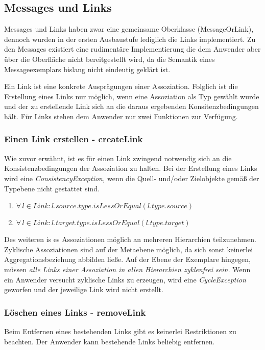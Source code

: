 \subsection{Messages und Links}

Messages und Links haben zwar eine gemeinsame Oberklasse (MessageOrLink), dennoch wurden in der
ersten Ausbaustufe lediglich die Links implementiert. Zu den Messages existiert eine rudimentäre
Implementierung die dem Anwender aber über die Oberfläche nicht bereitgestellt wird, da die 
Semantik eines Messageexemplars bislang nicht eindeutig geklärt ist. \vspace{15pt}


Ein Link ist eine konkrete Ausprägungen einer Assoziation. 
Folglich ist die Erstellung eines Links nur möglich, wenn eine Assoziation als Typ gewählt wurde und der zu erstellende Link
sich an die  daraus ergebenden Konsitenzbedingungen hält.
Für Links stehen dem Anwender nur zwei Funktionen zur Verfügung.

\subsubsection{Einen Link erstellen - createLink}
Wie zuvor erwähnt, ist es für einen Link zwingend notwendig sich an die Konsistenzbedingungen der Assoziation zu halten.
Bei der Erstellung eines Links wird eine \emph{ConsistencyException,} wenn die Quell- und/oder Zielobjekte gemäß der Typebene nicht 
gestattet sind.

\begin{enumerate}
\item $\forall \, l \in Link: l.source.type.isLessOrEqual(l.type.source)$
\item $\forall \, l \in Link: l.target.type.isLessOrEqual(l.type.target)$
\end{enumerate}

Des weiteren is es Assoziationen möglich an mehreren Hierarchien teilzunehmen. Zyklische Assoziationen sind auf der Metaebene möglich, 
da sich sonst keinerlei Aggregationsbeziehung abbilden ließe.
Auf der Ebene der Exemplare hingegen, müssen \emph{alle Links einer Assoziation in allen Hierarchien zyklenfrei sein.}
Wenn ein Anwender versucht zyklische Links zu erzeugen, wird eine \emph{CycleException} geworfen und der jeweilige Link wird nicht erstellt.

\subsubsection{Löschen eines Links - removeLink}
Beim Entfernen eines bestehenden Links gibt es keinerlei Restriktionen zu beachten. Der Anwender kann bestehende Links beliebig entfernen.